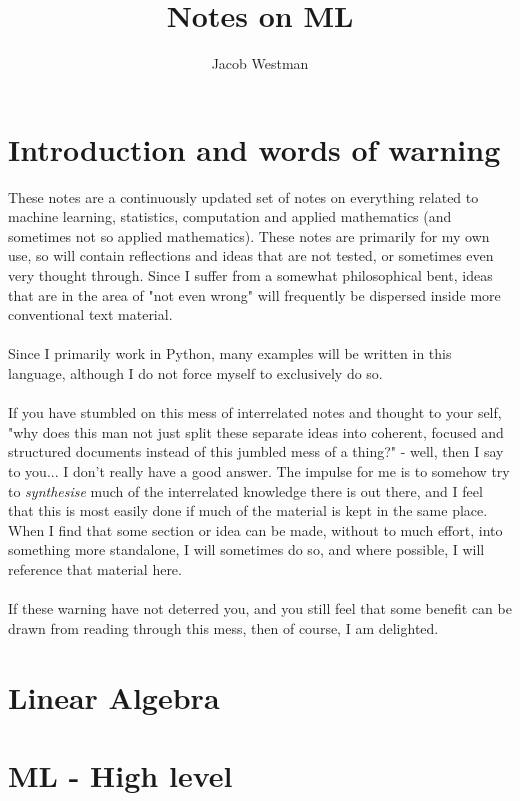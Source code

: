 \documentclass[10pt,a4paper]{article}
\begin{document}
\title{Notes on ML}
\author{Jacob Westman}
\maketitle

\tableofcontents
\pagebreak

\section{Introduction and words of warning}
These notes are a continuously updated set of notes on everything related to machine learning, statistics, computation and applied mathematics (and sometimes not so applied mathematics). These notes are primarily for my own use, so will contain reflections and ideas that are not tested, or sometimes even very thought through. Since I suffer from a somewhat philosophical bent, ideas that are in the area of "not even wrong" will frequently be dispersed inside more conventional text material.\\\\
Since I primarily work in Python, many examples will be written in this language, although I do not force myself to exclusively do so.\\\\
If you have stumbled on this mess of interrelated notes and thought to your self, "why does this man not just split these separate ideas into coherent, focused and structured documents instead of this jumbled mess of a thing?" -  well, then I say to you... I don't really have a good answer. The impulse for me is to somehow try to \textit{synthesise} much of the interrelated knowledge there is out there, and I feel that this is most easily done if much of the material is kept in the same place. When I find that some section or idea can be made, without to much effort, into something more standalone, I will sometimes do so, and where possible, I will reference that material here.\\\\
If these warning have not deterred you, and you still feel that some benefit can be drawn from reading through this mess, then of course, I am delighted.

\section{Linear Algebra}


\section{ML - High level}
\end{document}
